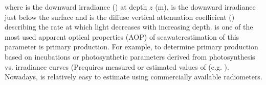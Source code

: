 \DIFaddbegin \noindent \DIFaddend where \edz{} is the downward irradiance (\DIFdelbegin {}\DIFdelend \DIFaddbegin \wmsquare{}\DIFaddend ) at depth $z$ (m), \edzero{} is the downward irradiance \DIFaddbegin \DIFadd{(}\wmsquare{}\DIFadd{) }\DIFaddend just below the surface and \DIFdelbegin %
\DIFdelend \DIFaddbegin {}\DIFaddend is the diffuse vertical attenuation coefficient (\DIFdelbegin {}\DIFdelend \DIFaddbegin \mminus{}\DIFaddend ) describing the rate at which light decreases with increasing depth. \ked{} is one of the most \DIFaddbegin {}\DIFaddend used apparent optical properties (AOP) of seawater\DIFdelbegin {}\DIFdelend \DIFaddbegin {}\DIFaddend estimation of this parameter is \DIFdelbegin {}\DIFdelend \DIFaddbegin {}\DIFaddend primary production. \DIFaddbegin \ked{} \ked{} \DIFaddend For example, to determine primary production based on \DIFdelbegin {}\DIFdelend \DIFaddbegin {}\DIFaddend incubations or photosynthetic parameters derived from photosynthesis vs. irradiance curves (P\DIFdelbegin {}\DIFdelend \DIFaddbegin {}\DIFaddend requires measured or estimated values of \ked{} (e.g. \citet{Morel1996}). Nowadays, \ked{} is relatively easy to estimate using commercially available radiometers.

